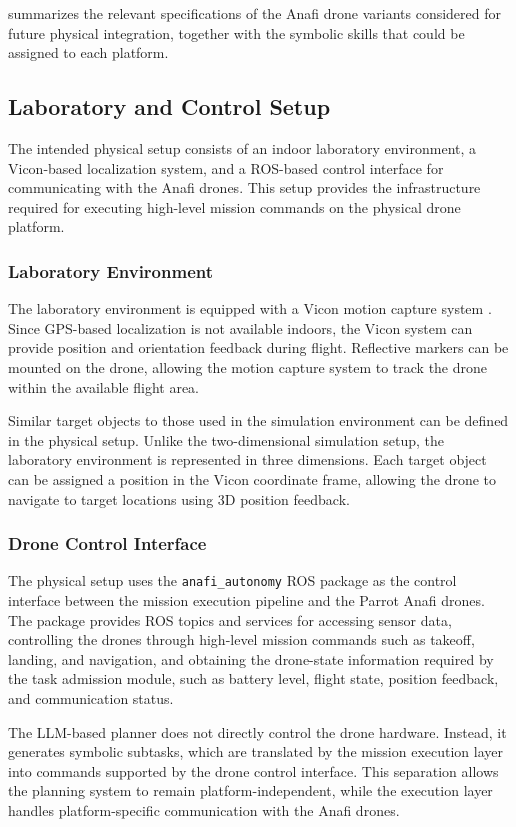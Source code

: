  summarizes the relevant specifications of the
Anafi drone variants considered for future physical integration, together with the symbolic
skills that could be assigned to each platform.



\subsection{Laboratory and Control Setup}

The intended physical setup consists of an indoor laboratory environment, a Vicon-based localization
system, and a ROS-based control interface for communicating with the Anafi drones. This setup provides
the infrastructure required for executing high-level mission commands on the physical drone platform.

\subsubsection{Laboratory Environment}

The laboratory environment is equipped with a Vicon motion capture system \cite{vicon_tracker}.
Since GPS-based localization is not available indoors, the Vicon system can provide position and
orientation feedback during flight. Reflective markers can be mounted on the drone, allowing the
motion capture system to track the drone within the available flight area.

Similar target objects to those used in the simulation environment can be defined in the physical
setup. Unlike the two-dimensional simulation setup, the laboratory environment is represented in three
dimensions. Each target object can be assigned a position in the Vicon coordinate frame, allowing the
drone to navigate to target locations using 3D position feedback.

\subsubsection{Drone Control Interface}

The physical setup uses the \texttt{anafi\_autonomy} ROS package
\cite{sarabakha2023anafiros} as the control interface between the mission execution pipeline and the
Parrot Anafi drones. The package provides ROS topics and services for accessing sensor data,
controlling the drones through high-level mission commands such as takeoff, landing, and navigation,
and obtaining the drone-state information required by the task admission module, such as battery level,
flight state, position feedback, and communication status.

The LLM-based planner does not directly control the drone hardware. Instead, it generates symbolic
subtasks, which are translated by the mission execution layer into commands supported by the drone
control interface. This separation allows the planning system to remain platform-independent, while
the execution layer handles platform-specific communication with the Anafi drones.
